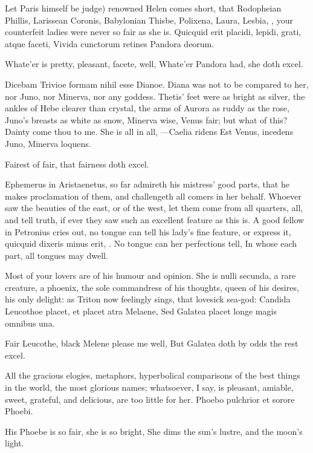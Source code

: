Let Paris himself be judge) renowned Helen comes short, that Rodopheian
Phillis, Larissean Coronis, Babylonian Thisbe, Polixena, Laura, Lesbia,
\etc{}, your counterfeit ladies were never so fair as she is.
Quicquid erit placidi, lepidi, grati, atque faceti,
Vivida cunctorum retines Pandora deorum.

Whate'er is pretty, pleasant, facete, well,
Whate'er Pandora had, she doth excel.

Dicebam Trivioe formam nihil esse Dianoe. Diana was not to be
compared to her, nor Juno, nor Minerva, nor any goddess. Thetis' feet
were as bright as silver, the ankles of Hebe clearer than crystal, the
arms of Aurora as ruddy as the rose, Juno's breasts as white as snow,
Minerva wise, Venus fair; but what of this? Dainty come thou to me. She
is all in all,
---Caelia ridens
Est Venus, incedens Juno, Minerva loquens.

Fairest of fair, that fairness doth excel.

Ephemerus in Aristaenetus, so far admireth his mistress' good parts,
that he makes proclamation of them, and challengeth all comers in her
behalf. Whoever saw the beauties of the east, or of the west, let
them come from all quarters, all, and tell truth, if ever they saw such
an excellent feature as this is. A good fellow in Petronius cries out,
no tongue can tell his lady's fine feature, or express it,
quicquid dixeris minus erit, \etc{}.
No tongue can her perfections tell,
In whose each part, all tongues may dwell.

Most of your lovers are of his humour and opinion. She is nulli
secunda, a rare creature, a phoenix, the sole commandress of his
thoughts, queen of his desires, his only delight: as Triton now
feelingly sings, that lovesick sea-god:
Candida Leucothoe placet, et placet atra Melaene,
Sed Galatea placet longe magis omnibus una.

Fair Leucothe, black Melene please me well,
But Galatea doth by odds the rest excel.

All the gracious elogies, metaphors, hyperbolical comparisons of the
best things in the world, the most glorious names; whatsoever, I say,
is pleasant, amiable, sweet, grateful, and delicious, are too little
for her.
Phoebo pulchrior et sorore Phoebi.

His Phoebe is so fair, she is so bright,
She dims the sun's lustre, and the moon's light.

